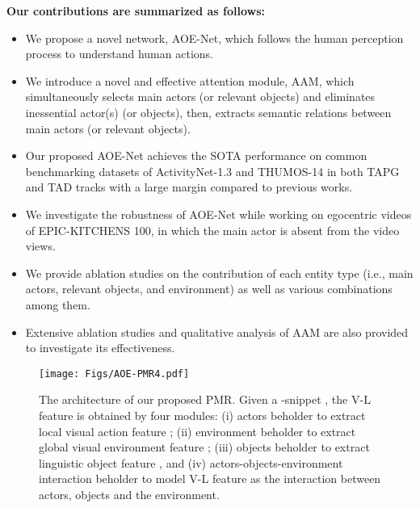 \documentclass[sn-mathphys]{sn-jnl}
\theoremstyle{thmstyleone}\newtheorem{theorem}{Theorem}\newtheorem{proposition}[theorem]{Proposition}
\theoremstyle{thmstyletwo}\newtheorem{example}{Example}\newtheorem{remark}{Remark}
\theoremstyle{thmstylethree}\newtheorem{definition}{Definition}
\begin{document}
\noindent\textbf{Our contributions are summarized as follows:}
\begin{itemize} \item We propose a novel network, AOE-Net, which follows the human perception process to understand human actions.
    \item We introduce a novel and effective attention module, AAM, which simultaneously selects main actors (or relevant objects) and eliminates inessential actor(s) (or objects), then, extracts semantic relations between main actors (or relevant objects).
    \item Our proposed AOE-Net achieves the SOTA performance on common benchmarking datasets of ActivityNet-1.3 and THUMOS-14 in both TAPG and TAD tracks with a large margin compared to previous works.
    \item We investigate the robustness of AOE-Net while working on egocentric videos of EPIC-KITCHENS 100, in which the main actor is absent from the video views.
    \item We provide ablation studies on the contribution of each entity type (i.e., main actors, relevant objects, and environment) as well as various combinations among them.
    \item Extensive ablation studies and qualitative analysis of AAM are also provided to investigate its effectiveness.
\end{itemize}

\begin{figure*}[t]
\centering
  \texttt{[image: Figs/AOE-PMR4.pdf]}
  \caption{The architecture of our proposed PMR. Given a -snippet , the V-L feature is obtained by four modules: (i) actors beholder to extract local visual action feature ; (ii) environment beholder to extract global visual environment feature ; (iii) objects beholder to extract linguistic object feature , and (iv) actors-objects-environment interaction beholder to model V-L feature as the interaction between actors, objects and the environment.}
  \label{fig:AOE-PMR}
\end{figure*}
\end{document}
